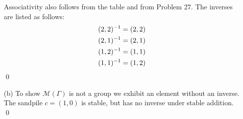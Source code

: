 \documentclass[../UNABRIDGEDalgebraNotesMSRI-UP2016.tex]{subfiles}
\begin{document}
\begin{frame}
\begin{itemize}
\item[] Associativity also follows from the table and from Problem 27.  The inverses are listed as follows:
\begin{align*}
(2,2)^{-1} &= (2,2) \\
(2,1)^{-1} &= (2,1) \\
(1,2)^{-1} &= (1,1) \\
(1,1)^{-1} &= (1,2)
\end{align*}
\qed

\smallGap
\item[(b)] To show $\mathscr M(\Gamma)$ is not a group we exhibit an element without an inverse.  The sandpile $c=(1,0)$ is stable, but has no inverse under stable addition.
\qed
\end{itemize}
\end{frame}
\end{document}
